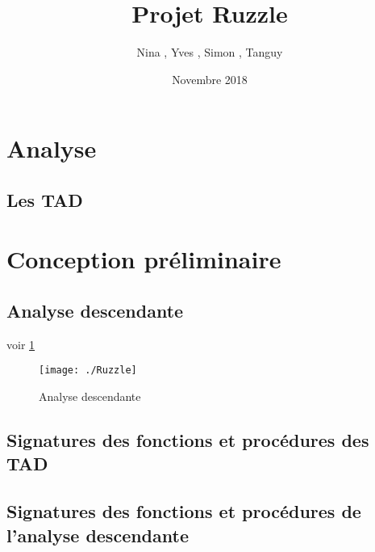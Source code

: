 \documentclass[a4paper]{article}
\title{Projet Ruzzle}
\author{Nina \noun{Lardière}, Yves \noun{Le Guennec}, Simon \noun{Lebeaud}, Tanguy \noun{Leclerc}}
\date{Novembre 2018}
\begin{document}
	\maketitle
	\section{Analyse}
		\subsection{Les TAD}
		

 \section{Conception préliminaire}
		\subsection{Analyse descendante}
			voir \ref{fig:AD}
			\begin{figure}
				\centering \texttt{[image: ./Ruzzle]} %
				\caption{\label{fig:AD}Analyse descendante}
			\end{figure}

		\subsection{Signatures des fonctions et procédures des TAD}
		
		

	\subsection{Signatures des fonctions et procédures de l'analyse descendante}
\end{document}
